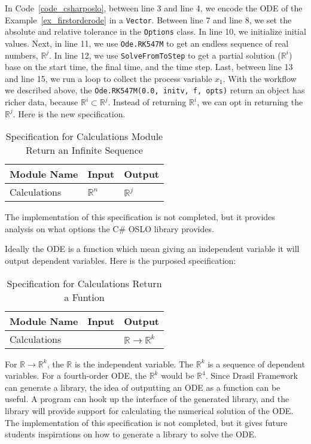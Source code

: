 In Code~\ref{code_csharposlo}, between line 3 and line 4, we encode the ODE of the Example~\ref{ex_firstorderode} in a \verb|Vector|. Between line 7 and line 8, we set the absolute and relative tolerance in the \verb|Options| class. In line 10, we initialize initial values. Next, in line 11, we use \verb|Ode.RK547M| to get an endless sequence of real numbers, $\mathbb{R}^j$. In line 12, we use \verb|SolveFromToStep| to get a partial solution ($\mathbb{R}^i$) base on the start time, the final time, and the time step. Last, between line 13 and line 15, we run a loop to collect the process variable $x_1$. With the workflow we described above, the \verb|Ode.RK547M(0.0, initv, f, opts)| return an object has richer data, because {}$\mathbb{R}^i \subset \mathbb{R}^j$. Instead of returning $\mathbb{R}^i$, we can opt in returning the $\mathbb{R}^j$. Here is the new specification.
\begin{table}[ht]
\centering
\begin{tabular}{p{} | p{} | p{}} \hline
    \textbf{Module Name}&\textbf{Input}&\textbf{Output}\\
    \toprule
    Calculations & $\mathbb{R}^n$ & $\mathbb{R}^j$ \\
    \bottomrule	
\end{tabular}	
\caption{Specification for Calculations Module Return an Infinite Sequence}	
\label{tab_srsforcal}
\end{table}
The implementation of this specification is not completed, but it provides analysis on what options the C\# OSLO library provides.

Ideally the ODE is a function which mean giving an independent variable it will output dependent variables. Here is the purposed specification:
\begin{table}[ht]
\centering
\begin{tabular}{p{} | p{} | p{}} \hline
    \textbf{Module Name}&\textbf{Input}&\textbf{Output}\\
    \toprule
    Calculations & & $\mathbb{R} \rightarrow \mathbb{R}^k$ \\
    \bottomrule	
\end{tabular}	
\caption{Specification for Calculations Return a Funtion}	
\label{tab_srsforcal}
\end{table}

For $\mathbb{R} \rightarrow \mathbb{R}^k$, the $\mathbb{R}$ is the independent variable. The $\mathbb{R}^k$ is a sequence of dependent variables. For a fourth-order ODE, the $\mathbb{R}^k$ would be $\mathbb{R}^4$. Since Drasil Framework can generate a library, the idea of outputting an ODE as a function can be useful. A program can hook up the interface of the generated library, and the library will provide support for calculating the numerical solution of the ODE. The implementation of this specification is not completed, but it gives future students inspirations on how to generate a library to solve the ODE.

